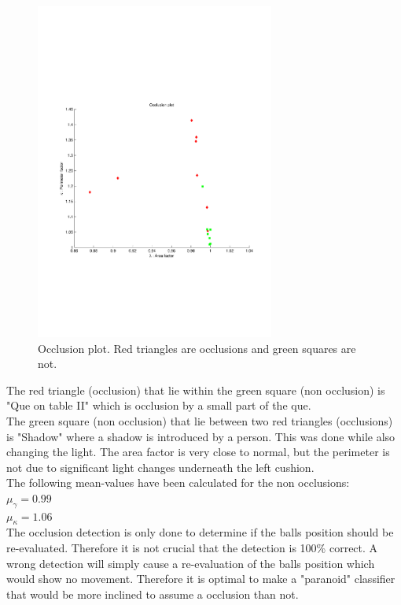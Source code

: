 \begin{figure}[H]
\begin{center}
\leavevmode
\includegraphics[width=0.7\textwidth]{images/occlusion_plot}
\end{center}
\caption{Occlusion plot. Red triangles are occlusions and green squares are not.}
\label{fig:occlusion_plot}
\end{figure}

The red triangle (occlusion) that lie within the green square (non occlusion) is "Que on table II" which is occlusion by a small part of the que.\\

The green square (non occlusion) that lie between two red triangles (occlusions) is "Shadow" where a shadow is introduced by a person. This was done while also changing the light. The area factor is very close to normal, but the perimeter is not due to significant light changes underneath the left cushion.\\

The following mean-values have been calculated for the non occlusions:\\

$\mu_{\gamma} = 0.99$\\
$\mu_{\kappa} = 1.06$\\

The occlusion detection is only done to determine if the balls position should be re-evaluated. Therefore it is not crucial that the detection is 100\% correct. A wrong detection will simply cause a re-evaluation of the balls position which would show no movement. Therefore it is optimal to make a "paranoid" classifier that would be more inclined to assume a occlusion than not.\\

